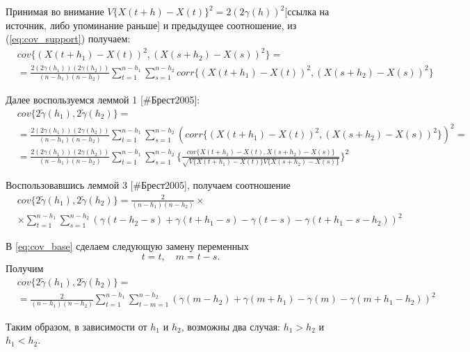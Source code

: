 Принимая во внимание $ V \{ X(t + h) - X(t) \}^2 = 2 ( 2 \gamma(h) )^2 $[ссылка на источник, либо упоминание раньше] и предыдущее соотношение, из (\ref{eq:cov_support}) получаем:
\begin{eqnarray*}
	& cov\{ (X(t + h_1) - X(t))^2, (X(s + h_2) - X(s))^2 \} = \\
	& = \frac{2 (2\gamma(h_1))(2\gamma(h_2))}{(n - h_1)(n - h_2)}\sum_{t = 1}^{n - h_1}\sum_{s = 1}^{n - h_2} corr\{(X(t + h_1) - X(t))^2, (X(s + h_2) - X(s))^2 \}
\end{eqnarray*}

Далее воспользуемся леммой 1 [\#Брест2005]:
\begin{eqnarray*}
	& cov\{ 2 \tilde{\gamma}(h_1), 2 \tilde{\gamma}(h_2) \} = \\
	& = \frac{2 (2\gamma(h_1))(2\gamma(h_2))}{(n - h_1)(n - h_2)}\sum_{t = 1}^{n - h_1}\sum_{s = 1}^{n - h_2} (corr\{(X(t + h_1) - X(t))^2, (X(s + h_2) - X(s))^2 \})^2 = \\
	& = \frac{2 (2\gamma(h_1))(2\gamma(h_2))}{(n - h_1)(n - h_2)}\sum_{t = 1}^{n - h_1}\sum_{s = 1}^{n - h_2} \{\frac{cov\{ X(t + h_1) - X(t), X(s + h_2) - X(s) \}}{\sqrt{V\{ X( t + h_1) - X(t) \} V\{ X(s + h_2) - X(s) \}}} \}^2
\end{eqnarray*}

Воспользовавшись леммой 3 [\#Брест2005], получаем соотношение
\begin{eqnarray}
\nonumber
\label{eq:cov_base}
	& cov\{ 2 \tilde{\gamma}(h_1), 2 \tilde{\gamma}(h_2) \} = \frac{2}{(n - h_1)(n - h_2)} \times \\
	& \times \sum_{t = 1}^{n - h_1}\sum_{s = 1}^{n - h_2} (\gamma(t - h_2 - s) + \gamma(t + h_1 - s) - \gamma(t - s) - \gamma(t + h_1 - s - h_2))^2
\end{eqnarray}

В \eqref{eq:cov_base} сделаем следующую замену переменных
\begin{equation*}
	t = t, \quad m = t - s.
\end{equation*}
Получим
\begin{eqnarray}
\nonumber
\label{eq:cov_split}
	& cov\{ 2 \tilde{\gamma}(h_1), 2 \tilde{\gamma}(h_2) \} = \\
	& = \frac{2}{(n - h_1) (n - h_2)} \sum_{t = 1}^{n - h_1}\sum_{t - m = 1}^{n - h_2} (\gamma(m - h_2) + \gamma(m + h_1) - \gamma(m) - \gamma(m + h_1 - h_2))^2
\end{eqnarray}

Таким образом, в зависимости от $h_1$ и $h_2$, возможны два случая: $h_1 > h_2$ и $h_1 < h_2$.

